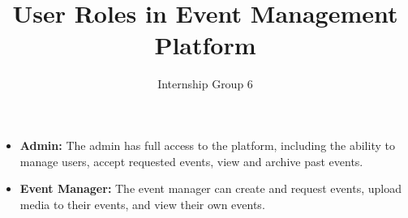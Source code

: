 \documentclass{article}
\title{User Roles in Event Management Platform}
\author{Internship Group 6}
\begin{document}
\maketitle
\begin{itemize}
    \item \textbf{Admin:} The admin has full access to the platform, including the ability to manage users, accept requested events, view and archive past events.
    \item \textbf{Event Manager:} The event manager can create and request events, upload media to their events, and view their own events.
\end{itemize}
\end{document}
